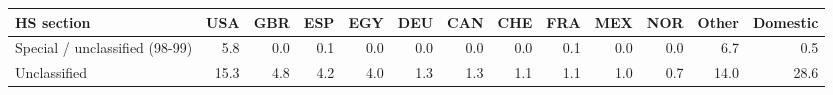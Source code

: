 \begin{tabular}{lrrrrrrrrrrrr}
\toprule
HS section & USA & GBR & ESP & EGY & DEU & CAN & CHE & FRA & MEX & NOR & Other & Domestic \\
\midrule
Special / unclassified (98-99) & 5.8 & 0.0 & 0.1 & 0.0 & 0.0 & 0.0 & 0.0 & 0.1 & 0.0 & 0.0 & 6.7 & 0.5 \\
Unclassified & 15.3 & 4.8 & 4.2 & 4.0 & 1.3 & 1.3 & 1.1 & 1.1 & 1.0 & 0.7 & 14.0 & 28.6 \\
\bottomrule
\end{tabular}
